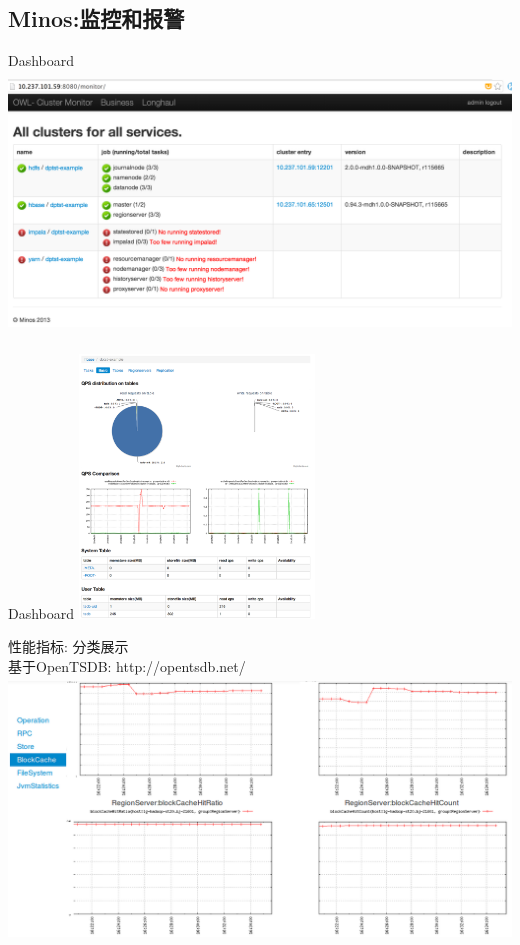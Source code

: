 \documentclass[xcolor=table]{beamer}
\begin{document}
\begin{CJK}{UTF8}{gkai}
\subsection{Minos:监控和报警}
\begin{frame}{\subsecname}
	Dashboard
	\includegraphics[width=\textwidth, height=7cm]{owl-1.png}
\end{frame}

\begin{frame}{\subsecname}
	Dashboard
	\includegraphics[width=\textwidth, height=7cm]{owl-2.png}
\end{frame}

\begin{frame}{\subsecname}
	性能指标: 分类展示 \\
	基于OpenTSDB: http://opentsdb.net/
	\includegraphics[width=\textwidth, height=7cm]{metrics.png}
\end{frame}


\end{CJK}
\end{document}
